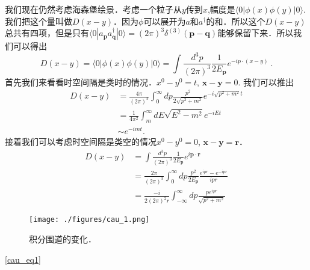 
我们现在仍然考虑海森堡绘景．考虑一个粒子从$y$传到$x$,幅度是$\langle 0 |\phi(x)\phi(y)| 0 \rangle$.我们把这个量叫做$D(x-y)$．因为$\phi$可以展开为$a$和$a^\dagger$的和．所以这个$D(x-y)$总共有四项，但是只有$\langle 0 | a_{\mathbf p} a^\dagger_{\mathbf q} | 0 \rangle = (2\pi)^3 \delta^{(3)}(\mathbf p - \mathbf q)$能够保留下来．所以我们可以得出
\begin{equation}
D(x-y)=\langle 0|\phi(x) \phi(y)| 0\rangle=\int \frac{d^{3} p}{(2 \pi)^{3}} \frac{1}{2 E_{\mathbf{p}}} e^{-i p \cdot(x-y)}~.
\end{equation}
首先我们来看看时空间隔是类时的情况．$x^0 - y^0 = t$, $\mathbf x - \mathbf y = 0$. 我们可以推出
\begin{equation}
\begin{aligned}
D(x-y) &=\frac{4 \pi}{(2 \pi)^{3}} \int_{0}^{\infty} d p \frac{p^{2}}{2 \sqrt{p^{2}+m^{2}}} e^{-i \sqrt{p^{2}+m^{2}} t} \\
&=\frac{1}{4 \pi^{2}} \int_{m}^{\infty} d E \sqrt{E^{2}-m^{2}} e^{-i E t} \\
& \sim e^{-i m t} .
\end{aligned}
\end{equation}
接着我们可以考虑时空间隔是类空的情况$x^0 - y^0 = 0$, $\mathbf x - \mathbf y = \mathbf r$．
\begin{equation}\label{cau_eq1}
\begin{aligned}
D(x-y) &=\int \frac{d^{3} p}{(2 \pi)^{3}} \frac{1}{2 E_{\mathbf{p}}} e^{i \mathbf{p} \cdot \mathbf{r}} \\
&=\frac{2 \pi}{(2 \pi)^{3}} \int_{0}^{\infty} d p \frac{p^{2}}{2 E_{\mathbf{p}}} \frac{e^{i p r}-e^{-i p r}}{i p r} \\
&=\frac{-i}{2(2 \pi)^{2} r} \int_{-\infty}^{\infty} d p \frac{p e^{i p r}}{\sqrt{p^{2}+m^{2}}}
\end{aligned}
\end{equation}
\begin{figure}[ht]
\centering
\texttt{[image: ./figures/cau\_1.png]}
\caption{积分围道的变化．} \label{cau_fig1}
\end{figure}
\autoref{cau_eq1} 

